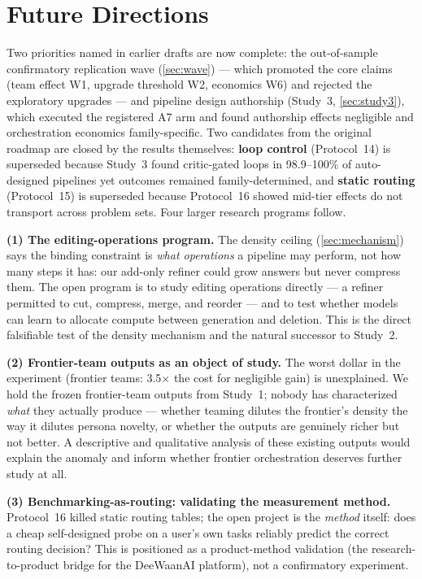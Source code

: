 \documentclass[12pt,a4paper]{article}
\begin{document}
\section{Future Directions}\label{sec:future}

Two priorities named in earlier drafts are now complete: the out-of-sample
confirmatory replication wave (\cref{sec:wave}) --- which promoted the core
claims (team effect W1, upgrade threshold W2, economics W6) and rejected the
exploratory upgrades --- and pipeline design authorship (Study~3,
\cref{sec:study3}), which executed the registered A7 arm and found authorship
effects negligible and orchestration economics family-specific. Two candidates
from the original roadmap are closed by the results themselves: \textbf{loop
control} (Protocol~14) is superseded because Study~3 found critic-gated loops
in 98.9--100\% of auto-designed pipelines yet outcomes remained
family-determined, and \textbf{static routing} (Protocol~15) is superseded
because Protocol~16 showed mid-tier effects do not transport across problem
sets. Four larger research programs follow.

\textbf{(1) The editing-operations program.} The density ceiling
(\cref{sec:mechanism}) says the binding constraint is \emph{what operations} a
pipeline may perform, not how many steps it has: our add-only refiner could
grow answers but never compress them. The open program is to study editing
operations directly --- a refiner permitted to cut, compress, merge, and
reorder --- and to test whether models can learn to allocate compute between
generation and deletion. This is the direct falsifiable test of the density
mechanism and the natural successor to Study~2.

\textbf{(2) Frontier-team outputs as an object of study.} The worst dollar in
the experiment (frontier teams: 3.5$\times$ the cost for negligible gain) is
unexplained. We hold the frozen frontier-team outputs from Study~1; nobody has
characterized \emph{what} they actually produce --- whether teaming dilutes the
frontier's density the way it dilutes persona novelty, or whether the outputs
are genuinely richer but not better. A descriptive and qualitative analysis of
these existing outputs would explain the anomaly and inform whether frontier
orchestration deserves further study at all.

\textbf{(3) Benchmarking-as-routing: validating the measurement method.}
Protocol~16 killed static routing tables; the open project is the
\emph{method} itself: does a cheap self-designed probe on a user's own tasks
reliably predict the correct routing decision? This is positioned as a
product-method validation (the research-to-product bridge for the DeeWaanAI
platform), not a confirmatory experiment.
\end{document}
